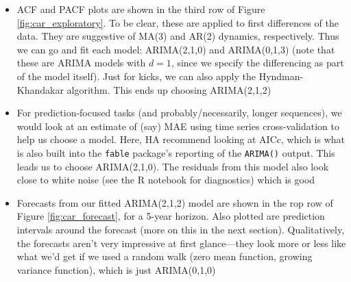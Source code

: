 \documentclass{article}
\begin{document}
\begin{itemize}
\item ACF and PACF plots are shown in the third row of Figure
  \ref{fig:car_exploratory}. To be clear, these are applied to first differences
  of the data. They are suggestive of MA(3) and AR(2) dynamics,
  respectively. Thus we can go and fit each model: ARIMA(2,1,0) and ARIMA(0,1,3)
  (note that these are ARIMA models with $d=1$, since we specify the
  differencing as part of the model itself). Just for kicks, we can also apply
  the Hyndman-Khandakar algorithm. This ends up choosing ARIMA(2,1,2)     

\item For prediction-focused tasks (and probably/necessarily, longer sequences),
  we would look at an estimate of (say) MAE using time series cross-validation
  to help us choose a model. Here, HA recommend looking at AICc, which is what
  is also built into the \verb|fable| package's reporting of the \verb|ARIMA()| 
  output. This leads us to choose ARIMA(2,1,0). The residuals from this model
  also look close to white noise (see the R notebook for diagnostics) which is
  good  

\item Forecasts from our fitted ARIMA(2,1,2) model are shown in the rop row of
  Figure \ref{fig:car_forecast}, for a 5-year horizon. Also plotted are
  prediction intervals around the forecast (more on this in the next section).
  Qualitatively, the forecasts aren't very impressive at first glance---they
  look more or less like what we'd get if we used a random walk (zero mean
  function, growing variance function), which is just ARIMA(0,1,0)    


\end{itemize}
\end{document}

